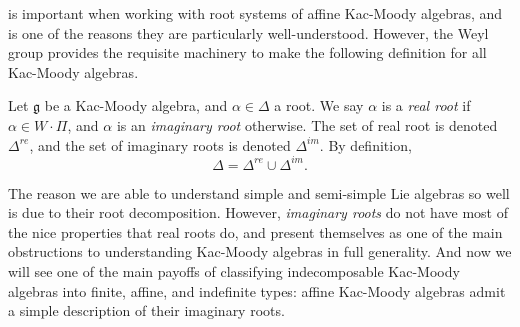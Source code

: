 \documentclass[11pt, letterpaper]{article}
\theoremstyle{plain}
\begin{document}
 is important when working with root systems of affine Kac-Moody algebras, and is one of the reasons they are particularly well-understood. However, the Weyl group provides the requisite machinery to make the following definition for all Kac-Moody algebras.


\begin{definition}\label{dfn:5-4}
	Let $\mathfrak{g} $ be a Kac-Moody algebra, and $\alpha \in \Delta $ a root. We say $\alpha $ is a \emph{real root} if $\alpha \in W\cdot \Pi $, and $\alpha $ is an \emph{imaginary root} otherwise. The set of real root is denoted $\Delta ^{re} $, and the set of imaginary roots is denoted $\Delta ^{i m} $. By definition,
	\[
		\Delta =\Delta ^{re} \cup \Delta ^{i m} 
	.\]
\end{definition}

The reason we are able to understand simple and semi-simple Lie algebras so well is due to their root decomposition. However, \emph{imaginary roots} do not have most of the nice properties that real roots do, and present themselves as one of the main obstructions to understanding Kac-Moody algebras in full generality. And now we will see one of the main payoffs of classifying indecomposable Kac-Moody algebras into finite, affine, and indefinite types: affine Kac-Moody algebras admit a simple description of their imaginary roots.
\end{document}

